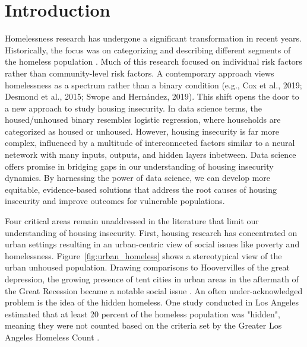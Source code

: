 \chapter{Introduction}  

Homelessness research has undergone a significant transformation in recent years. Historically, the focus was on categorizing and describing different segments of the homeless population \citep{lee_homelessness_2021}. Much of this research focused on individual risk factors rather than community-level risk factors. A contemporary approach views homelessness as a spectrum rather than a binary condition (e.g., Cox et al., 2019; Desmond et al., 2015; Swope and Hernández, 2019). This shift opens the door to a new approach to study housing insecurity. In data science terms, the housed/unhoused binary resembles logistic regression, where households are categorized as housed or unhoused. However, housing insecurity is far more complex, influenced by a multitude of interconnected factors similar to a neural netework with many inputs, outputs, and hidden layers inbetween. Data science offers promise in bridging gaps in our understanding of housing insecurity dynamics. By harnessing the power of data science, we can develop more equitable, evidence-based solutions that address the root causes of housing insecurity and improve outcomes for vulnerable populations.

Four critical areas remain unaddressed in the literature that limit our understanding of housing insecurity. First, housing research has concentrated on urban settings resulting in an urban-centric view of social issues like poverty and homelessness. Figure~\ref{fig:urban_homeless}  shows a stereotypical view of the urban unhoused population. Drawing comparisons to Hoovervilles of the great depression, the growing presence of tent cities in urban areas in the aftermath of the Great Recession became a notable social issue \citep{herring_roots_2015}. An often under-acknowledged problem is the idea of the hidden homeless. One study conducted in Los Angeles estimated that at least 20 percent of the homeless population was "hidden", meaning they were not counted based on the criteria set by the Greater Los Angeles Homeless Count \citep{agans_enumerating_2014}.  \textcolor{white}{\citep{molina_notitle_2023}} %

